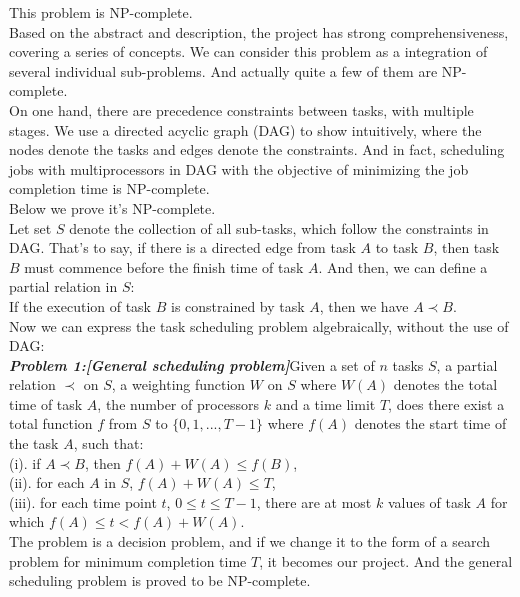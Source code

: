\documentclass{llncs}
\begin{document}
This problem is NP-complete.\\
\indent\setlength{\parindent}{2em} Based on the abstract and description, the project has strong comprehensiveness, covering a series of concepts. We can consider this problem as a integration of several individual sub-problems. And actually quite a few of them are NP-complete.\\
\indent\setlength{\parindent}{2em}On one hand, there are precedence constraints between tasks, with multiple stages. We use a directed acyclic graph (DAG) to show intuitively, where the nodes denote the tasks and edges denote the constraints. And in fact, scheduling jobs with multiprocessors in DAG with the objective of minimizing the job completion time is NP-complete\cite{ref_article2}.\\
\indent\setlength{\parindent}{2em}Below we prove it’s NP-complete.\\
\indent\setlength{\parindent}{2em}Let set $S$ denote the collection of all sub-tasks, which follow the constraints in DAG. That’s to say, if there is a directed edge from task $A$ to task $B$, then task $B$ must commence before the finish time of task $A$. And then, we can define a partial relation in $S$:\\
\indent\setlength{\parindent}{2em}If the execution of task $B$ is constrained by task $A$, then we have $A\prec B$.\\
\indent\setlength{\parindent}{2em}Now we can express the task scheduling problem algebraically, without the use of DAG:\\
\indent\setlength{\parindent}{2em}\textbf{\textit{Problem 1:[General scheduling problem]}}Given a set of $n$ tasks $S$, a partial relation $\prec$ on $S$, a weighting function $W$ on $S$ where $W(A)$ denotes the total time of task $A$, the number of processors $k$ and a time limit $T$, does there exist a total function $f$ from $S$ to $\{0, 1, ..., T-1\}$ where $f(A)$ denotes the start time of the task $A$, such that:\\
\indent\setlength{\parindent}{2em}(i). if $A\prec B$, then $f(A)+W(A)\leqslant f(B)$,\\
\indent\setlength{\parindent}{2em}(ii). for each $A$ in $S$, $f(A)+W(A)\leqslant T$,\\
\indent\setlength{\parindent}{2em}(iii). for each time point $t$, $0\leqslant t\leqslant T-1$, there are at most $k$ values of task $A$ for which $f(A)\leqslant t< f(A)+W(A)$.\\ 
\indent\setlength{\parindent}{2em}The problem is a decision problem, and if we change it to the form of a search problem for minimum completion time $T$, it becomes our project. And the general scheduling problem is proved to be NP-complete.\\
\end{document}
